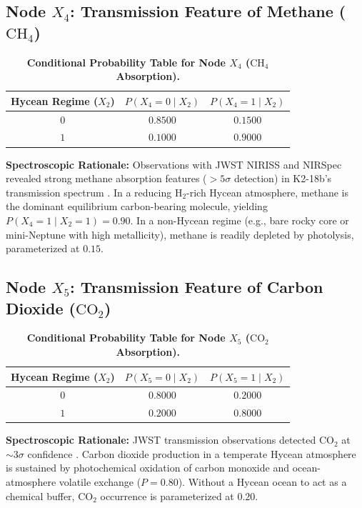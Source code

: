 \subsection{Node $X_4$: Transmission Feature of Methane ($\mathrm{CH}_4$)}
\begin{table}[htbp]
\centering
\caption{\textbf{Conditional Probability Table for Node $X_4$ ($\mathrm{CH}_4$ Absorption).}}
\label{tab:cpt_x4}
\small
\begin{tabular}{ccc}
\toprule
\textbf{Hycean Regime ($X_2$)} & $P(X_4 = 0 \mid X_2)$ & $P(X_4 = 1 \mid X_2)$ \\
\midrule
$0$ & $0.8500$ & $0.1500$ \\
$1$ & $0.1000$ & $0.9000$ \\
\bottomrule
\end{tabular}
\end{table}
\textbf{Spectroscopic Rationale:} Observations with JWST NIRISS and NIRSpec revealed strong methane absorption features ($>5\sigma$ detection) in K2-18b's transmission spectrum \cite{madhusudhan2023}. In a reducing $\mathrm{H}_2$-rich Hycean atmosphere, methane is the dominant equilibrium carbon-bearing molecule, yielding $P(X_4=1 \mid X_2=1) = 0.90$. In a non-Hycean regime (e.g., bare rocky core or mini-Neptune with high metallicity), methane is readily depleted by photolysis, parameterized at $0.15$.

\subsection{Node $X_5$: Transmission Feature of Carbon Dioxide ($\mathrm{CO}_2$)}
\begin{table}[htbp]
\centering
\caption{\textbf{Conditional Probability Table for Node $X_5$ ($\mathrm{CO}_2$ Absorption).}}
\label{tab:cpt_x5}
\small
\begin{tabular}{ccc}
\toprule
\textbf{Hycean Regime ($X_2$)} & $P(X_5 = 0 \mid X_2)$ & $P(X_5 = 1 \mid X_2)$ \\
\midrule
$0$ & $0.8000$ & $0.2000$ \\
$1$ & $0.2000$ & $0.8000$ \\
\bottomrule
\end{tabular}
\end{table}
\textbf{Spectroscopic Rationale:} JWST transmission observations detected $\mathrm{CO}_2$ at $\sim 3\sigma$ confidence \cite{madhusudhan2023}. Carbon dioxide production in a temperate Hycean atmosphere is sustained by photochemical oxidation of carbon monoxide and ocean-atmosphere volatile exchange ($P = 0.80$). Without a Hycean ocean to act as a chemical buffer, $\mathrm{CO}_2$ occurrence is parameterized at $0.20$.

